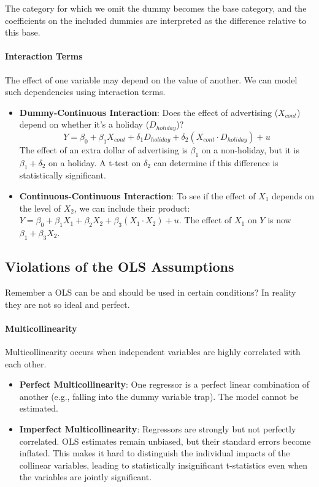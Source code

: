 \documentclass{article}
\providecommand{\tightlist}{
  \setlength{\itemsep}{0pt}
  \setlength{\parskip}{0pt}}
\begin{document}
The category for which we omit the dummy becomes the base category, and the coefficients on the included dummies are interpreted as the difference relative to this base.


\paragraph{Interaction Terms}
The effect of one variable may depend on the value of another. We can model such dependencies using interaction terms.

\begin{itemize}
    \tightlist
    \item \textbf{Dummy-Continuous Interaction}: Does the effect of advertising ($X_{cont}$) depend on whether it's a holiday ($D_{holiday}$)?
    \begin{equation}
        Y = \beta_0 + \beta_1 X_{cont} + \delta_1 D_{holiday} + \delta_2 (X_{cont} \cdot D_{holiday}) + u
    \end{equation}
    The effect of an extra dollar of advertising is $\beta_1$ on a non-holiday, but it is $\beta_1 + \delta_2$ on a holiday. A t-test on $\delta_2$ can determine if this difference is statistically significant.
    
    \item \textbf{Continuous-Continuous Interaction}: To see if the effect of $X_1$ depends on the level of $X_2$, we can include their product: $Y = \beta_0 + \beta_1 X_1 + \beta_2 X_2 + \beta_3 (X_1 \cdot X_2) + u$. The effect of $X_1$ on $Y$ is now $\beta_1 + \beta_3 X_2$.
\end{itemize}

\subsection{Violations of the OLS Assumptions}
\label{sub:ols_violations}

Remember a OLS can be and should be used in certain conditions? In reality they are not so ideal and perfect.

\paragraph{Multicollinearity}
Multicollinearity occurs when independent variables are highly correlated with each other.
\begin{itemize}
    \tightlist
    \item \textbf{Perfect Multicollinearity}: One regressor is a perfect linear combination of another (e.g., falling into the dummy variable trap). The model cannot be estimated.
    \item \textbf{Imperfect Multicollinearity}: Regressors are strongly but not perfectly correlated. OLS estimates remain unbiased, but their standard errors become inflated. This makes it hard to distinguish the individual impacts of the collinear variables, leading to statistically insignificant t-statistics even when the variables are jointly significant.
\end{itemize}
\end{document}
